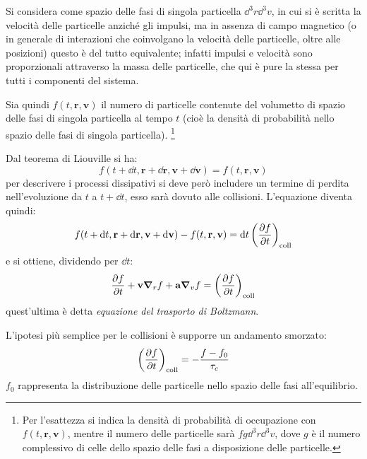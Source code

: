 Si considera come spazio delle fasi di singola particella $ \dd^3 r \dd^3 v $, in cui si è scritta la velocità delle particelle anziché gli impulsi, ma in assenza di campo magnetico (o in generale di interazioni che coinvolgano la velocità delle particelle, oltre alle posizioni) questo è del tutto equivalente; infatti impulsi e velocità sono proporzionali attraverso la massa delle particelle, che qui è pure la stessa per tutti i componenti del sistema.

Sia quindi $ f(t,\textbf{r},\textbf{v}) $ il numero di particelle contenute del volumetto di spazio delle fasi di singola particella al tempo $ t $ (cioè la densità di probabilità nello spazio delle fasi di singola particella).
\footnote{Per l'esattezza si indica la densità di probabilità di occupazione con $ f(t,\textbf{r},\textbf{v})  $, mentre il numero delle particelle sarà $ f g \dd^3 r \dd^3 v $, dove $ g $ è il numero complessivo di celle dello spazio delle fasi a disposizione delle particelle.}

Dal teorema di Liouville si ha:
\begin{equation*}
f(t + \dd t,\textbf{r} + \dd \textbf{r},\textbf{v} + \dd \textbf{v}) = f(t,\textbf{r},\textbf{v}) 
\end{equation*}
per descrivere i processi dissipativi si deve però includere un termine di perdita nell'evoluzione da $ t $ a $ t + \dd t $, esso sarà dovuto alle collisioni. L'equazione diventa quindi:
\begin{equation*}
f(t + \dd t,\textbf{r} + \dd \textbf{r},\textbf{v} + \dd \textbf{v}) - f(t,\textbf{r},\textbf{v}) = \dd t \left(\frac{\partial {f}}{\partial {t}}\right)_{\text{coll}}
\end{equation*}
e si ottiene, dividendo per $ \dd t $:
\begin{equation*}
\frac{\partial {f}}{\partial {t}} + \textbf{v} \grad_r f + \textbf{a} \grad_v f = \left(\frac{\partial {f}}{\partial {t}}\right)_{\text{coll}}
\end{equation*}
quest'ultima è detta \textit{equazione del trasporto di Boltzmann}.

L'ipotesi più semplice per le collisioni è supporre un andamento smorzato:
\begin{equation*}
\left(\frac{\partial {f}}{\partial {t}}\right)_{\text{coll}} = - \frac{f - f_0}{\tau_c}
\end{equation*}
$ f_0 $ rappresenta la distribuzione delle particelle nello spazio delle fasi all'equilibrio.

